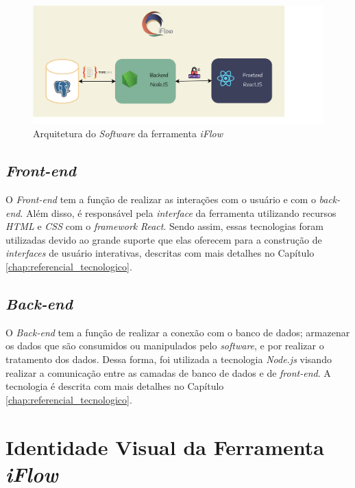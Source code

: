 \begin{figure}[H]
    \begin{center}
        \caption{{Arquitetura do \textit{Software} da ferramenta \textit{iFlow}}}
        \label{fig:arquitetura}
        \includegraphics[scale=1.0]{figuras/Proposta/arquitetura.png}
    \end{center}
\end{figure}

\subsection{\textit{Front-end}}
O \textit{Front-end} tem a função de realizar as interações com o usuário e com o \textit{back-end}. Além disso, é responsável pela \textit{interface} da ferramenta utilizando recursos \textit{HTML} e \textit{CSS} com o \textit{framework} \textit{React}. Sendo assim, essas tecnologias foram utilizadas devido ao grande suporte que elas oferecem para a construção de \textit{interfaces} de usuário interativas, descritas com mais detalhes no Capítulo \ref{chap:referencial_tecnologico}.

\subsection{\textit{Back-end}}
O \textit{Back-end} tem a função de realizar a conexão com o banco de dados; armazenar os dados que são consumidos ou manipulados pelo \textit{software}, e por realizar o tratamento dos dados. Dessa forma, foi utilizada a tecnologia \textit{Node.js} visando realizar a comunicação entre as camadas de banco de dados e de \textit{front-end}. A tecnologia é descrita com mais detalhes no Capítulo \ref{chap:referencial_tecnologico}.

\section{Identidade Visual da Ferramenta \textit{iFlow}}

